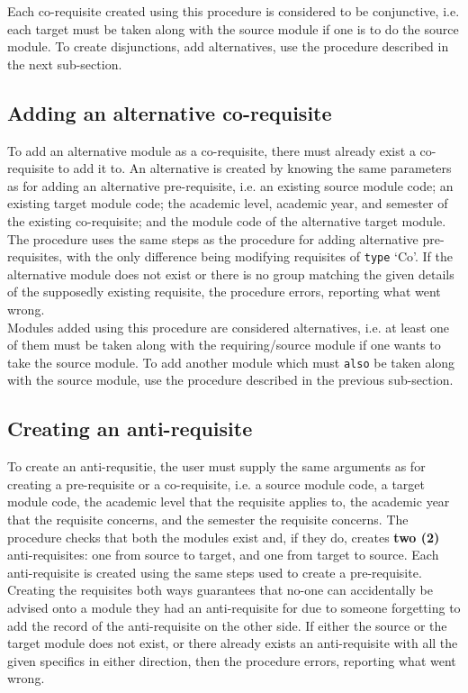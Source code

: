     Each co-requisite created using this procedure is considered to be
    conjunctive, i.e. each target must be taken along with the source module if
    one is to do the source module. To create disjunctions, add alternatives,
    use the procedure described in the next sub-section.
    
    
    \subsection{Adding an alternative co-requisite}
    To add an alternative module as a co-requisite, there must already exist a
    co-requisite to add it to. An alternative is created by knowing the same
    parameters as for adding an alternative pre-requisite, i.e. an existing
    source module code; an existing target module code; the academic level,
    academic year, and semester of the existing co-requisite; and the module
    code of the alternative target module. The procedure uses the same steps as
    the procedure for adding alternative pre-requisites, with the only
    difference being modifying requisites of \texttt{type} `Co'. If the
    alternative module does not exist or there is no group matching the given
    details of the supposedly existing requisite, the procedure errors,
    reporting what went wrong.
    \\
    
    Modules added using this procedure are considered alternatives, i.e. at
    least one of them must be taken along with the requiring/source module if
    one wants to take the source module. To add another module which must
    \texttt{also} be taken along with the source module, use the procedure
    described in the previous sub-section.
    
    \subsection{Creating an anti-requisite}
    To create an anti-requsitie, the user must supply the same arguments as for
    creating a pre-requisite or a co-requisite, i.e. a source module code, a
    target module code, the academic level that the requisite applies to, the
    academic year that the requisite concerns, and the semester the requisite
    concerns. The procedure checks that both the modules exist and, if they do,
    creates \textbf{two (2)} anti-requisites: one from source to target, and one
    from target to source. Each anti-requisite is created using the same steps
    used to create a pre-requisite. Creating the requisites both ways guarantees
    that no-one can accidentally be advised onto a module they had an
    anti-requisite for due to someone forgetting to add the record of the
    anti-requisite on the other side. If either the source or the target module
    does not exist, or there already exists an anti-requisite with all the given
    specifics in either direction, then the procedure errors, reporting what
    went wrong.
    \\
    

